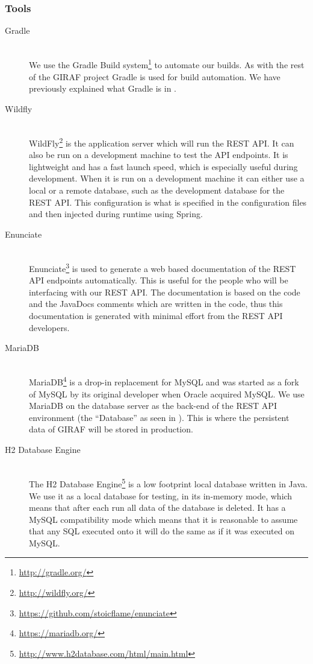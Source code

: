 \subsubsection{Tools}
\begin{description}
    \item[Gradle] \hfill \\
        We use the Gradle Build system\footnote{\url{http://gradle.org/}} to automate our builds.
        As with the rest of the GIRAF project Gradle is used for build automation.
        We have previously explained what Gradle is in .

    \item[Wildfly] \hfill \\
        WildFly\footnote{\url{http://wildfly.org/}} is the application server which will run the REST API.
        It can also be run on a development machine to test the API endpoints.
        It is lightweight and has a fast launch speed, which is especially useful during development.
        When it is run on a development machine it can either use a local or a remote database, such as the development database for the REST API.
        This configuration is what is specified in the configuration files and then injected during runtime using Spring.

    \item[Enunciate] \hfill \\
        Enunciate\footnote{\url{https://github.com/stoicflame/enunciate}} is used to generate a web based documentation of the REST API endpoints automatically.
        This is useful for the people who will be interfacing with our REST API.
        The documentation is based on the code and the JavaDocs comments which are written in the code, thus this documentation is generated with minimal effort from the REST API developers.

    \item[MariaDB] \hfill \\
        MariaDB\footnote{\url{https://mariadb.org/}} is a drop-in replacement for MySQL and was started as a fork of MySQL by its original developer when Oracle acquired MySQL.
        We use MariaDB on the database server as the back-end of the REST API environment (the \enquote{Database} as seen in ).
        This is where the persistent data of GIRAF will be stored in production.

    \item[H2 Database Engine] \hfill \\
        The H2 Database Engine\footnote{\url{http://www.h2database.com/html/main.html}} is a low footprint local database written in Java.
        We use it as a local database for testing, in its in-memory mode, which means that after each run all data of the database is deleted.
        It has a MySQL compatibility mode which means that it is reasonable to assume that any SQL executed onto it will do the same as if it was executed on MySQL.


\end{description}
